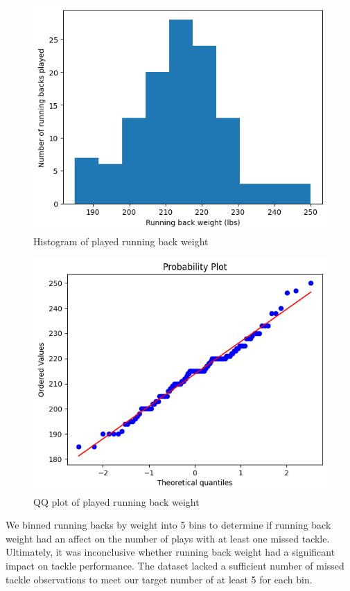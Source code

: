 \documentclass[bibtex, sigconf, hyperref={colorlinks=true,linkcolor=blue,urlcolor=blue}]{acmart}
\begin{document}
\begin{figure}[h]
  \centering
  \includegraphics[width=\linewidth]{running-back-weight.png}
  \caption{Histogram of played running back weight}
\end{figure}

\begin{figure}[h]
  \centering
  \includegraphics[width=\linewidth]{running-back-weight-qq.png}
  \caption{QQ plot of played running back weight}
\end{figure}

We binned running backs by weight into 5 bins to determine if running back
weight had an affect on the number of plays with at least one missed tackle.
Ultimately, it was inconclusive whether running back weight had a significant
impact on tackle performance. The dataset lacked a sufficient number of missed
tackle observations to meet our target number of at least 5 for each bin.
\end{document}
